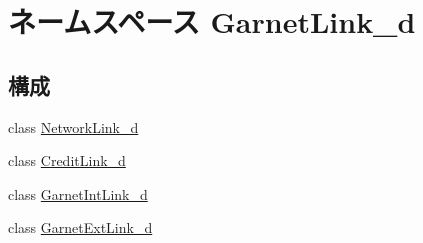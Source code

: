 \hypertarget{namespaceGarnetLink__d}{
\section{ネームスペース GarnetLink\_\-d}
\label{namespaceGarnetLink__d}
}
\subsection*{構成}
\begin{DoxyCompactItemize}
\item 
class \hyperlink{classGarnetLink__d_1_1NetworkLink__d}{NetworkLink\_\-d}
\item 
class \hyperlink{classGarnetLink__d_1_1CreditLink__d}{CreditLink\_\-d}
\item 
class \hyperlink{classGarnetLink__d_1_1GarnetIntLink__d}{GarnetIntLink\_\-d}
\item 
class \hyperlink{classGarnetLink__d_1_1GarnetExtLink__d}{GarnetExtLink\_\-d}
\end{DoxyCompactItemize}
